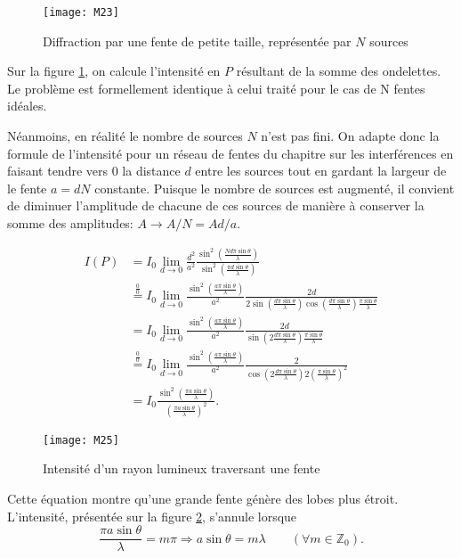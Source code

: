\begin{figure}[h]
    \centering
    \texttt{[image: M23]}
    \caption{Diffraction par une fente de petite taille, représentée par $N$ sources}
    \label{f2}
\end{figure}

\noindent Sur la figure \ref{f2}, on calcule l'intensité en $P$ résultant de la somme des ondelettes. Le problème est formellement identique à celui traité pour le cas de N fentes idéales.

\noindent Néanmoins, en réalité le nombre de sources $N$ n'est pas fini. On adapte donc la formule de l'intensité pour un réseau de fentes du chapitre sur les interférences en faisant tendre vers $0$ la distance $d$ entre les sources tout en gardant la largeur de le fente $a=dN$ constante. Puisque le nombre de sources est augmenté, il convient de diminuer l'amplitude de chacune de ces sources de manière à conserver la somme des amplitudes: $A \rightarrow A/N=Ad/a$.

\begin{align*}
I(P) & =I_0\lim_{d\to 0} \frac{d^2}{a^2}\frac{\sin^2(\frac{Nd\pi \sin\theta}{\lambda})}{\sin^2(\frac{\pi d\sin\theta}{\lambda})}\\
& \overset{\frac{0}{0}}{=} I_0\lim_{d\to 0} \frac{\sin^2(\frac{a\pi \sin\theta}{\lambda})}{a^2}\frac{2d}{2\sin(\frac{d\pi \sin\theta}{\lambda})\cos(\frac{d\pi \sin\theta}{\lambda})\frac{\pi \sin\theta}{\lambda}}\\
& =I_0 \lim_{d\to 0} \frac{\sin^2(\frac{a\pi \sin\theta}{\lambda})}{a^2}\frac{2d}{\sin(2\frac{d\pi \sin\theta}{\lambda})\frac{\pi \sin\theta}{\lambda}}\\
& \overset{\frac{0}{0}}{=}I_0 \lim_{d\to 0} \frac{\sin^2(\frac{a\pi \sin\theta}{\lambda})}{a^2}\frac{2}{\cos(2\frac{d\pi \sin\theta}{\lambda})2(\frac{\pi \sin\theta}{\lambda})^2}\\
& =I_0 \frac{\sin^2(\frac{\pi a \sin\theta}{\lambda})}{(\frac{\pi a \sin\theta}{\lambda})^2}.
\end{align*}

\begin{figure}[h]
\texttt{[image: M25]}
\caption{Intensité d'un rayon lumineux traversant une fente}
\label{f3}
\end{figure}

\noindent Cette équation montre qu'une grande fente génère des lobes plus étroit. L'intensité, présentée sur la figure \ref{f3}, s'annule lorsque
$$
  \frac{\pi a \sin\theta}{\lambda}=m\pi \Rightarrow a \sin\theta = m\lambda \qquad(\forall m\in  \mathbb{Z}_0).
$$

